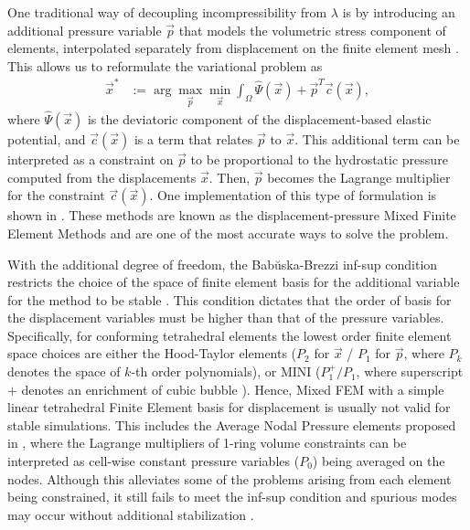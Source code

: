 One traditional way of decoupling incompressibility from $\lambda$ is by introducing an
additional pressure variable $\vec{p}$ that models the volumetric stress component of elements,
interpolated separately from displacement on the finite element mesh \cite{Bathe:2006}. This allows us to reformulate the variational problem as
\begin{align}
\vec{x}^* &:= \arg \max_{\vec{p}} \min_{\vec{x}} \int_{\Omega} \hat{\Psi}(\vec{x}) + \vec{p}^T \vec{c}(\vec{x}),
\label{eq:mixed_variational}
\end{align}
where $\hat{\Psi}(\vec{x})$ is the deviatoric component of the displacement-based elastic potential,
and $\vec{c}(\vec{x})$ is a term that relates $\vec{p}$ to $\vec{x}$. This additional term can be
interpreted as a constraint on $\vec{p}$ to be proportional to the hydrostatic pressure computed
from the displacements $\vec{x}$. Then, $\vec{p}$ becomes the Lagrange multiplier for the constraint
$\vec{c}(\vec{x})$.  One implementation of this type of formulation is shown in 
\cite{Sussman:1987}.  These methods are known as the displacement-pressure Mixed Finite Element
Methods and are one of the most accurate ways to solve the problem.

With the additional degree of freedom, the Bab\u{u}ska-Brezzi inf-sup condition restricts the 
choice of the space of finite element basis for the additional variable for the method to be stable \cite{bathe:2001}. 
This condition dictates that the order of basis for the displacement variables must be higher than that
of the pressure 
variables. Specifically, for conforming tetrahedral elements the lowest order finite element space choices are either 
the Hood-Taylor elements ($P_2$ for $\vec{x}$ / $P_1$ for $\vec{p}$, where $P_k$ denotes the space of $k$-th order polynomials), or MINI ($P_1^+ / P_1$, where superscript $+$ denotes an enrichment of cubic bubble \cite{arnold:1984}).
Hence, Mixed FEM with a simple linear tetrahedral Finite Element basis for displacement is usually not valid for stable simulations. 
This includes the Average Nodal Pressure elements proposed in \cite{Irving:2007}, where the Lagrange multipliers of 1-ring volume constraints can be interpreted as cell-wise constant pressure variables ($P_0$) being averaged on the nodes. Although this alleviates some of the problems arising from each element being constrained, it still fails to meet the inf-sup condition and spurious modes may occur without additional stabilization \cite{puso:2006}. 


